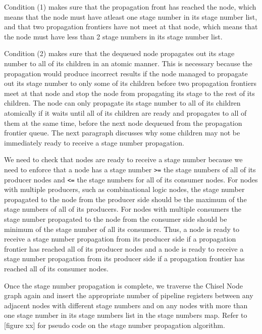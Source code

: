 Condition (1) makes sure that the propagation front has reached the
node, which means that the node must have atleast one stage number in
its stage number list, and that two propagation frontiers have not
meet at that node, which means that the node must have less than 2
stage numbers in its stage number list.  

Condition (2) makes sure that the dequeued node propagates out its
stage number to all of its children in an atomic manner. This is
necessary because the propagation would produce incorrect results if
the node managed to propagate out its stage number to only some of its
children before two propagation frontiers meet at that node and stop
the node from propagating its stage to the rest of its children. The
node can only propagate its stage number to all of its children
atomically if it waits until all of its children are ready and
propagates to all of them at the same time, before the next node
dequeued from the propagation frontier queue. The next paragraph
discusses why some children may not be immediately ready to receive a
stage number propagation. 

We need to check that nodes are ready to receive a stage number
because we need to enforce that a node has a stage number {\tt >=} the
stage numbers of all of its producer nodes and {\tt <=} the stage
numbers for all of its consumer nodes. For nodes with multiple
producers, such as combinational logic nodes, the stage number
propagated to the node from the producer side should be the maximum of
the stage numbers of all of its producers. For nodes with multiple
consumers the stage number propagated to the node from the consumer
side should be minimum of the stage number of all its consumers. Thus,
a node is ready to receive a stage number propagation from its
producer side if a propagation frontier has reached all of its
producer nodes and a node is ready to receive a stage number
propagation from its producer side if a propagation frontier has
reached all of its consumer nodes. 

Once the stage number propagation is complete, we traverse the Chisel
Node graph again and insert the appropriate number of pipeline
registers between any adjacent nodes with different stage numbers and
on any nodes with more than one stage number in its stage numbers list
in the stage numbers map. Refer to [figure xx] for pseudo code on the
stage number propagation algorithm. 

